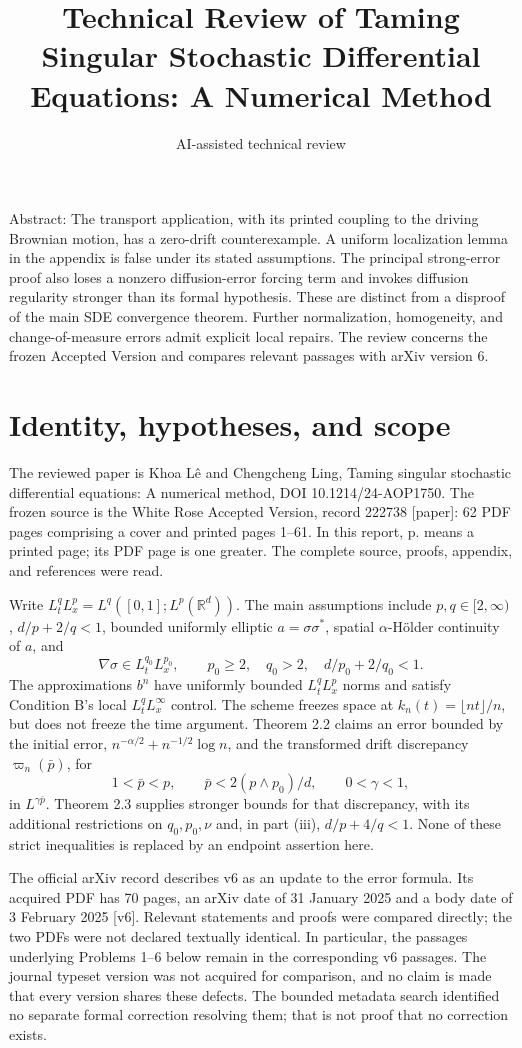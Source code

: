 \documentclass[10pt]{article}
\title{Technical Review of Taming Singular Stochastic Differential Equations: A Numerical Method}
\author{AI-assisted technical review}
\date{}
\begin{document}
\maketitle
Abstract: The transport application, with its printed coupling to the driving Brownian motion, has a zero-drift counterexample. A uniform localization lemma in the appendix is false under its stated assumptions. The principal strong-error proof also loses a nonzero diffusion-error forcing term and invokes diffusion regularity stronger than its formal hypothesis. These are distinct from a disproof of the main SDE convergence theorem. Further normalization, homogeneity, and change-of-measure errors admit explicit local repairs. The review concerns the frozen Accepted Version and compares relevant passages with arXiv version 6.\par
\section*{Identity, hypotheses, and scope}
The reviewed paper is Khoa Lê and Chengcheng Ling, Taming singular stochastic differential equations: A numerical method, DOI 10.1214/24-AOP1750. The frozen source is the White Rose Accepted Version, record 222738 [paper]: 62 PDF pages comprising a cover and printed pages 1–61. In this report, p. means a printed page; its PDF page is one greater. The complete source, proofs, appendix, and references were read.\par
Write \(L^q_tL^p_x=L^q([0,1];L^p(\mathbb R^d))\). The main assumptions include \(p,q\in[2,\infty)\), \(d/p+2/q<1\), bounded uniformly elliptic \(a=\sigma\sigma^*\), spatial \(\alpha\)-Hölder continuity of \(a\), and \[\nabla\sigma\in L^{q_0}_tL^{p_0}_x,\qquad
p_0\geq2,\quad q_0>2,\quad d/p_0+2/q_0<1.\] The approximations \(b^n\) have uniformly bounded \(L^q_tL^p_x\) norms and satisfy Condition B’s local \(L^q_tL^\infty_x\) control. The scheme freezes space at \(k_n(t)=\lfloor nt\rfloor/n\), but does not freeze the time argument. Theorem 2.2 claims an error bounded by the initial error, \(n^{-\alpha/2}+n^{-1/2}\log n\), and the transformed drift discrepancy \(\varpi_n(\bar p)\), for \[1<\bar p<p,\qquad \bar p<2(p\wedge p_0)/d,\qquad 0<\gamma<1,\] in \(L^{\gamma\bar p}\). Theorem 2.3 supplies stronger bounds for that discrepancy, with its additional restrictions on \(q_0,p_0,\nu\) and, in part (iii), \(d/p+4/q<1\). None of these strict inequalities is replaced by an endpoint assertion here.\par
The official arXiv record describes v6 as an update to the error formula. Its acquired PDF has 70 pages, an arXiv date of 31 January 2025 and a body date of 3 February 2025 [v6]. Relevant statements and proofs were compared directly; the two PDFs were not declared textually identical. In particular, the passages underlying Problems 1–6 below remain in the corresponding v6 passages. The journal typeset version was not acquired for comparison, and no claim is made that every version shares these defects. The bounded metadata search identified no separate formal correction resolving them; that is not proof that no correction exists.\par
\end{document}
